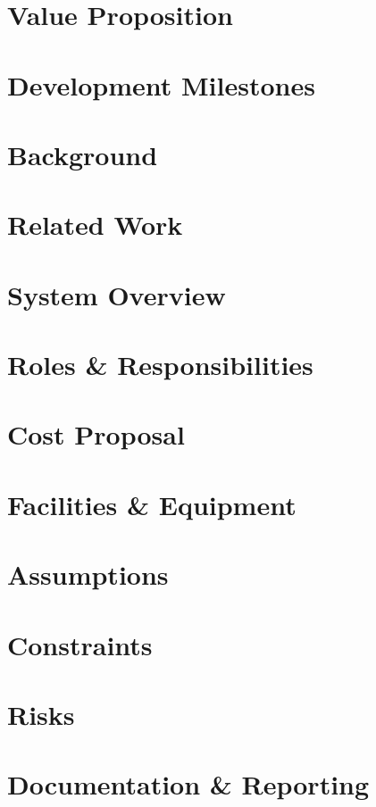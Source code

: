 \documentclass[11pt,letterpaper]{article}
\begin{document}
\section{Value Proposition}

\section{Development Milestones}

\newpage

\section{Background}

\section{Related Work}

\section{System Overview}

\section{Roles \& Responsibilities}

\section{Cost Proposal}

\section{Facilities \& Equipment}

\section{Assumptions}

\section{Constraints}

\section{Risks}

\section{Documentation \& Reporting}

\newpage

% 

{}
\end{document}
